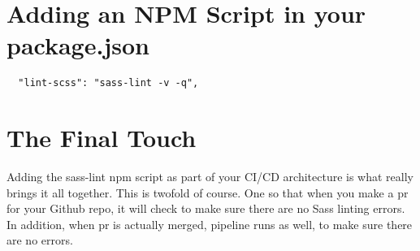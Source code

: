 \section{Adding an NPM Script in your package.json}
\begin{verbatim}
  "lint-scss": "sass-lint -v -q",
\end{verbatim}

\section{The Final Touch}

Adding the sass-lint npm script as part of your CI/CD architecture is what
really brings it all together. This is twofold of course. One so that when you
make a pr for your Github repo, it will check to make sure there are no Sass
linting errors. In addition, when pr is actually merged, pipeline runs as well,
to make sure there are no errors.
